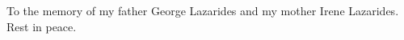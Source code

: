 \begin{dedication}
To the memory of my father George Lazarides and my mother Irene Lazarides. Rest in peace.

\meaning\pagenumbering

\meaning\setfrontpagenumbering
\end{dedication}